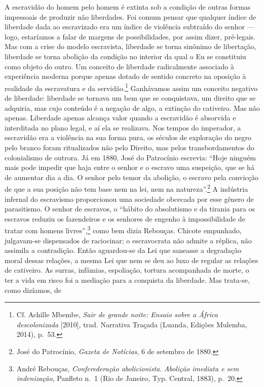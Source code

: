 A escravidão do homem pelo homem é extinta sob a condição de outras
formas impessoais de produzir não liberdades. Foi comum pensar que
qualquer índice de liberdade dada ao escravizado era um índice de
violência subtraído do senhor --- logo, estaríamos a falar de margens de
possibilidades, por assim dizer, pré-legais. Mas com a crise do modelo
escravista, liberdade se torna sinônimo de libertação, liberdade se
torna abolição da condição no interior da qual o Eu se constituiu como
objeto do outro. Um conceito de liberdade radicalmente associado à
experiência moderna porque apenas dotado de sentido concreto na oposição
à realidade da escravatura e da servidão.\footnote{Cf. Achille Mbembe,
  \textit{Sair de grande noite: Ensaio sobre a África descolonizada}
  {[}2010{]}, trad. Narrativa Traçada (Luanda, Edições Mulemba, 2014),
  p.~53.} Ganhávamos assim um conceito negativo de liberdade: liberdade
se tornava um bem que se conquistava, um direito que se adquiria, mas
cujo conteúdo é a negação de algo, a extinção do cativeiro. Mas não
apenas. Liberdade apenas alcança valor quando a escravidão é absorvida e
interditada no plano legal, e aí ela se realizava. Nos tempos do
imperador, a escravidão era a violência na sua forma pura, os séculos de
exploração do negro pelo branco foram ritualizados não pelo Direito, mas
pelos transbordamentos do colonialismo de outrora. Já em 1880, José do
Patrocínio escrevia: ``Hoje ninguém mais pode impedir que haja entre o
senhor e o escravo uma suspeição, que se há de aumentar dia a dia. O
senhor pelo temor da abolição, o escravo pela convicção de que a sua
posição não tem base nem na lei, nem na natureza''.\footnote{José do
  Patrocínio, \textit{Gazeta de Notícias}, 6 de setembro de 1880.} A
indústria infernal do escravismo proporcionou uma sociedade obcecada por
esse gênero de parasitismo. O senhor de escravos, o ``hábito do
absolutismo e da tirania para os escravos reduziu os fazendeiros e os
senhores de engenho à impossibilidade de tratar com homens
livres'',\footnote{André Rebouças, \textit{Conferederação abolicionista}.
  \textit{Abolição imediata e sem indenização}, Panfleto n.~1 (Rio de
  Janeiro, Typ. Central, 1883), p.~20.} como bem dizia Rebouças. Chicote
empunhado, julgavam-se dispensados de raciocinar; o escravocrata não
admite a réplica, não assimila a contradição. Então aguardou-se da Lei
que saneasse a degradação moral dessas relações, a mesma Lei que nem se
deu ao luxo de regular as relações de cativeiro. As surras, infâmias,
espoliação, tortura acompanhada de morte, o ter a vida em risco foi a
mediação para a conquista da liberdade. Mas trata-se, como dizíamos, de
